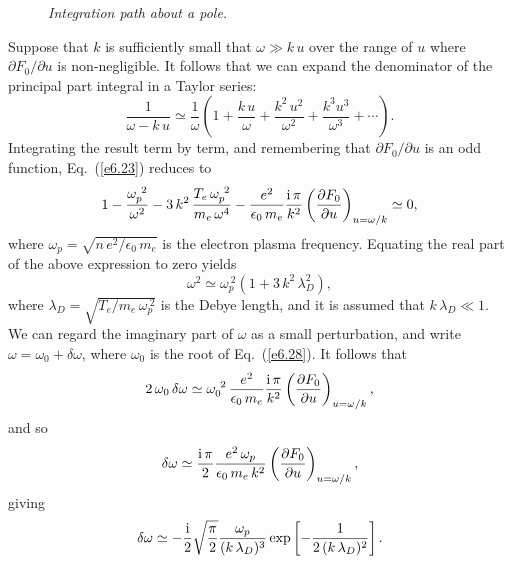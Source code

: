 \begin{figure}
\epsfysize=2in
\centerline{}
\caption{\em Integration path about a pole.}\label{f33}
\end{figure}

Suppose that $k$ is sufficiently small that $\omega\gg k\,u$ over the
range of $u$ where $\partial F_0/\partial u$ is non-negligible. It follows
that we can expand the denominator of the principal part integral in a
Taylor series:
\begin{equation}
\frac{1}{\omega-k\,u} \simeq \frac{1}{\omega}\left(1+ \frac{k\,u}{\omega}
+ \frac{k^2\,u^2}{\omega^2} + \frac{k^3 u^3}{\omega^3} + \cdots\right).
\end{equation}
Integrating the result term by term, and remembering that $\partial F_0/\partial u$
is an odd function, Eq.~(\ref{e6.23}) reduces to
\begin{equation}
1-\frac{\omega_p^{~2}}{\omega^2} - 3\,k^2\,\frac{T_e\,\omega_p^{~2}}{m_e\,\omega^4}
- \frac{e^2}{\epsilon_0\,m_e} \frac{{\rm i}\,\pi}{k^2} \left(\frac{\partial
F_0}{\partial u}\right)_{u=\omega/k} \simeq 0,
\end{equation}
where $\omega_p=\sqrt{n\,e^2/\epsilon_0\,m_e}$ is the electron plasma frequency.
Equating the real part of the above expression to zero yields
\begin{equation}\label{e6.28}
\omega^2 \simeq \omega_p^{~2}(1+ 3\,k^2\,\lambda_D^2),
\end{equation}
where $\lambda_D =\sqrt{T_e/m_e\,\omega_p^{~2}}$ is the Debye length, and it
is assumed that $k\,\lambda_D\ll 1$. We can regard the imaginary
part of $\omega$ as a small perturbation, and write $\omega=\omega_0+\delta\omega$,
where $\omega_0$ is the root of Eq.~(\ref{e6.28}). It follows
that
\begin{equation}
2\,\omega_0\,\delta\omega \simeq \omega_0^{~2}\, \frac{e^2}{\epsilon_0\,m_e} \frac{{\rm i}\,\pi}{k^2} \left(\frac{\partial
F_0}{\partial u}\right)_{u=\omega/k},
\end{equation}
and so
\begin{equation}\label{e6.30}
\delta\omega \simeq \frac{{\rm i}\,\pi}{2} \frac{e^2\,\omega_p}{\epsilon_0\,m_e\,k^2}
 \left(\frac{\partial
F_0}{\partial u}\right)_{u=\omega/k},
\end{equation}
giving
\begin{equation}\label{e6.31}
\delta\omega \simeq - \frac{{\rm i}}{2}\sqrt{\frac{\pi}{2}} \frac{\omega_p}
{(k\,\lambda_D)^3} \exp\left[-\frac{1}{2\,(k\,\lambda_D)^2}\right].
\end{equation}

